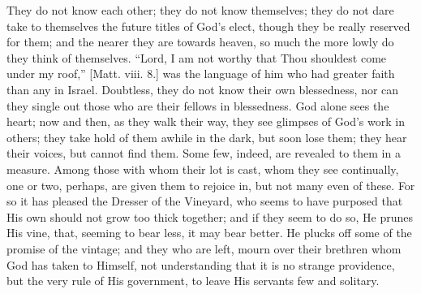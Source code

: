 They do not know each other; they do not know themselves; they do
not dare take to themselves the future titles of God's elect, though
they be really reserved for them; and the nearer they are towards
heaven, so much the more lowly do they think of themselves.
``Lord, I am not worthy that Thou shouldest come under my
roof,'' [Matt. viii. 8.] was the language of him who had greater
faith than any in Israel. Doubtless, they do not know their own
blessedness, nor can they single out those who are their fellows in
blessedness. God alone sees the heart; now and then, as they walk
their way, they see glimpses of God's work in others; they take hold
of them awhile in the dark, but soon lose them; they hear their
voices, but cannot find them. Some few, indeed, are revealed to them
in a measure. Among those with whom their lot is cast, whom they see
continually, one or two, perhaps, are given them to rejoice in, but
not many even of these. For so it has pleased the Dresser of the
Vineyard, who seems to have purposed that His own should not grow too
thick together; and if they seem to do so, He prunes His vine, that,
seeming to bear less, it may bear better. He plucks off some of the
promise of the vintage; and they who are left, mourn over their
brethren whom God has taken to Himself, not understanding that it is
no strange providence, but the very rule of His government, to leave
His servants few and solitary.

